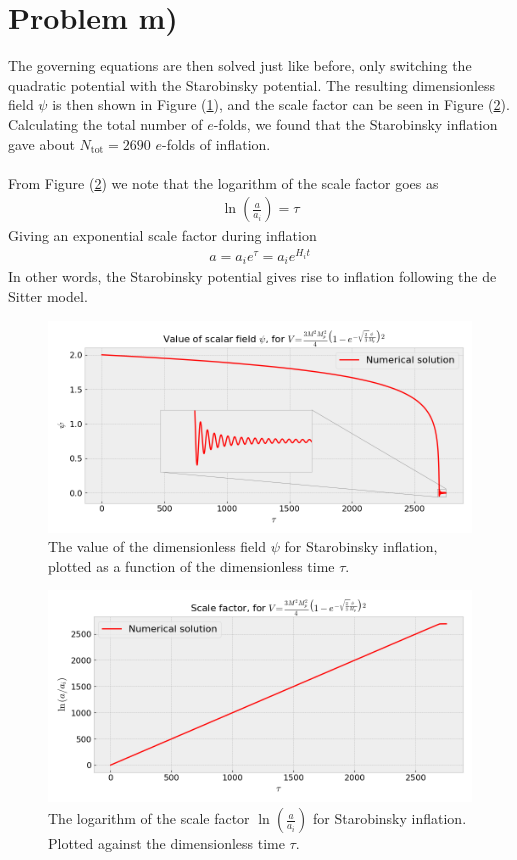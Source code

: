 \documentclass[reprint,english,notitlepage]{revtex4-1}  %
\numberwithin{equation}{section}
\begin{document}
\section{Problem m)}
The governing equations are then solved just like before, only switching the
quadratic potential with the Starobinsky potential. The resulting dimensionless
field $\psi$ is then shown in Figure (\ref{fig:Starobinsky_psi}), and the scale
factor can be seen in Figure (\ref{fig:Starobinsky_a}).
Calculating the total number of $e$-folds, we found that the Starobinsky inflation
gave about $N_\mathrm{tot}=2690$ $e$-folds of inflation.
\\ \\
From Figure (\ref{fig:Starobinsky_a}) we note that the logarithm of the scale
factor goes as
\begin{align}
	\ln\left( \frac{a}{a_i}\right) = \tau
\end{align}
Giving an exponential scale factor during inflation
\begin{align}
	a = a_i e^\tau = a_i e^{H_i t}
\end{align}
In other words, the Starobinsky potential gives rise to inflation following
the de Sitter model.
\begin{figure}[h!]
	\includegraphics[width=\linewidth]{StarobinskyPotential_field-value.png}
	\caption{The value of the dimensionless field $\psi$ for Starobinsky inflation,
	plotted as a function of the dimensionless time $\tau$.}
	\label{fig:Starobinsky_psi}
\end{figure}

\begin{figure}[h!]
	\includegraphics[width=\linewidth]{StarobinskyPotential_scale-factor.png}
	\caption{The logarithm of the scale factor $\ln\left(\frac{a}{a_i}\right)$
	for Starobinsky inflation. Plotted against the dimensionless time $\tau$.}
	\label{fig:Starobinsky_a}
\end{figure}
\end{document}
